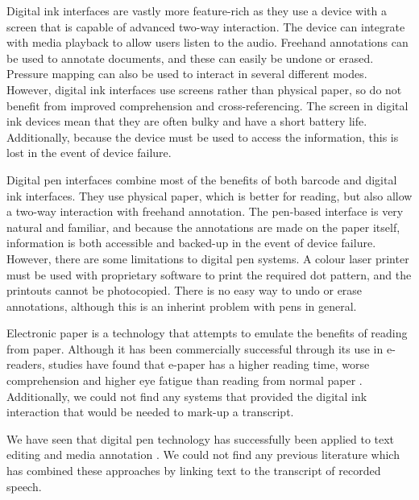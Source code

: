 Digital ink interfaces are vastly more feature-rich as they use a device with a screen that is capable of advanced
two-way interaction. The device can integrate with media playback to allow users listen to the audio. Freehand
annotations can be used to annotate documents, and these can easily be undone or erased. Pressure mapping can also be
used to interact in several different modes.  However, digital ink interfaces use screens rather than physical paper,
so do not benefit from improved comprehension and cross-referencing. The screen in digital ink devices mean that they
are often bulky and have a short battery life. Additionally, because the device must be used to access the information,
this is lost in the event of device failure.

Digital pen interfaces combine most of the benefits of both barcode and digital ink interfaces. They use physical
paper, which is better for reading, but also allow a two-way interaction with freehand annotation. The pen-based
interface is very natural and familiar, and because the annotations are made on the paper itself, information is both
accessible and backed-up in the event of device failure. However, there are some limitations to digital pen systems.
A colour laser printer must be used with proprietary software to print the required dot pattern, and the printouts
cannot be photocopied. There is no easy way to undo or erase annotations, although this is an inherint problem with
pens in general.

Electronic paper is a technology that attempts to emulate the benefits of reading from paper. Although it has been
commercially successful through its use in e-readers, studies have found that e-paper has a higher reading time, worse
comprehension and higher eye fatigue than reading from normal paper \citep{Jeong2012, Daniel2013}.
Additionally, we could not find any systems that provided the digital ink interaction that would be needed to mark-up a
transcript.


We have seen that digital pen technology has successfully been applied to text editing \citep{Weibel2008} and media
annotation \citep{Fouse2011}. We could not find any previous literature which has combined these approaches by linking
text to the transcript of recorded speech.

